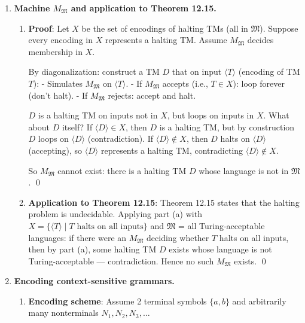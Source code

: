 \begin{enumerate}[{12.}1. ]
$T'$ satisfies all three conditions: (1) halts on all input (since $T$ does and the post-processing is finite); (2) writes $\pmb{Y}$ after accepted words; (3) writes $\pmb{N}$ after rejected words. And $L(T') = L_2(T) = L$. \qed

\item \textbf{Machine $M_{\mathfrak{M}}$ and application to Theorem 12.15.}

\begin{enumerate}
\item \textbf{Proof}: Let $X$ be the set of encodings of halting TMs (all in $\mathfrak{M}$). Suppose every encoding in $X$ represents a halting TM. Assume $M_{\mathfrak{M}}$ decides membership in $X$.

By diagonalization: construct a TM $D$ that on input $\langle T\rangle$ (encoding of TM $T$):
- Simulates $M_{\mathfrak{M}}$ on $\langle T\rangle$.
- If $M_{\mathfrak{M}}$ accepts (i.e., $T\in X$): loop forever (don't halt).
- If $M_{\mathfrak{M}}$ rejects: accept and halt.

$D$ is a halting TM on inputs not in $X$, but loops on inputs in $X$. What about $D$ itself? If $\langle D\rangle\in X$, then $D$ is a halting TM, but by construction $D$ loops on $\langle D\rangle$ (contradiction). If $\langle D\rangle\notin X$, then $D$ halts on $\langle D\rangle$ (accepting), so $\langle D\rangle$ represents a halting TM, contradicting $\langle D\rangle\notin X$.

So $M_{\mathfrak{M}}$ cannot exist: there is a halting TM $D$ whose language is not in $\mathfrak{M}$. \qed

\item \textbf{Application to Theorem 12.15}: Theorem 12.15 states that the halting problem is undecidable. Applying part (a) with $X = \{\langle T\rangle\mid T\text{ halts on all inputs}\}$ and $\mathfrak{M}$ = all Turing-acceptable languages: if there were an $M_{\mathfrak{M}}$ deciding whether $T$ halts on all inputs, then by part (a), some halting TM $D$ exists whose language is not Turing-acceptable --- contradiction. Hence no such $M_{\mathfrak{M}}$ exists. \qed
\end{enumerate}

\item \textbf{Encoding context-sensitive grammars.}

\begin{enumerate}
\item \textbf{Encoding scheme}: Assume 2 terminal symbols $\{a,b\}$ and arbitrarily many nonterminals $N_1, N_2, N_3, \ldots$


\end{enumerate}
\end{enumerate}
